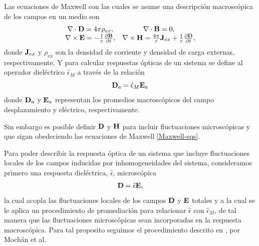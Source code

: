 \documentclass[12pt]{article}
\begin{document}
Las ecuaciones de Maxwell con las cuales se asume una descripción
macroscópica de los campos en un medio son
\begin{equation}
  \label{Maxwell-eqs}
  \begin{array}{cc}
    \nabla \cdot {\bf D} = 4\pi \rho_{ex}, & \nabla \cdot {\bf B} =0, \\
    \nabla \times {\bf E} = -\frac{1}{c}\frac{\partial {\bf B}}{\partial t}, &
    \nabla \times {\bf H} = \frac{4\pi}{c}{\bf
      J}_{ex} + \frac{1}{c}\frac{\partial {\bf D}}{\partial t},
  \end{array}
\end{equation}
donde ${\bf J}_{ex}$ y $\rho_{ex}$ son la densidad de corriente y
densidad de carga externas, respectivamente. Y para calcular
respuestas ópticas de un sistema se define al operador dieléctrico
$\hat{\epsilon}_{M}$ a través de la relación
\begin{equation}
  {\bf D}_{a} = \hat{\epsilon}_{M} {\bf E}_{a}
  \label{Def-Dilectric-Op}
\end{equation}
donde ${\bf D}_{a}$ y ${\bf E}_{a}$ representan los promedios macroscópicos del
campo desplazamiento y eléctrico, respectivamente.

Sin embargo es posible definir ${\bf D}$ y ${\bf H}$ para incluir
fluctuaciones microscópicas y que sigan obedeciendo las ecuaciones de
Maxwell \eqref{Maxwell-eqs}.

Para poder describir la respuesta óptica de un sistema que incluye
fluctuaciones locales de los campos inducidas por inhomogeneidades del
sistema, consideramos primero una respuesta dieléctrica,
$\hat{\epsilon}$, microscópica
\begin{equation}
  {\bf D} = \hat{\epsilon} {\bf E},
  \label{MicroscopicDielectric-Op}
\end{equation}
la cual acopla las fluctuaciones locales de los campos ${\bf D}$ y
${\bf E}$ totales y a la cual se le aplica un procedimiento de
promediación para relacionar $\hat{\epsilon}$ con
$\hat{\epsilon}_{M}$, de tal manera que las fluctuaciones
microscópicas sean incorporadas en la respuesta macroscópica. Para tal
proposito seguimos el procedimiento descrito en
\cite{ElectromagneticResponseofSystemwithSpatialFluctuations}, por
Mochán et al.
\end{document}
